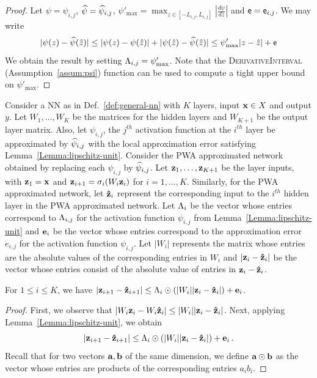 \begin{proof}
        Let $\psi=\psi_{i,j}$, $\widehat{\psi} = \widehat{\psi}_{i,j}$, $\psi'_{\max} = \max_{z \in [-L_{i,j}, L_{i,j}]} \left|\frac{d\psi}{dz}\right|$ and $\mathsf{e}= \mathsf{e}_{i,j}$. We may write
	\begin{equation*}
	    | \psi(z) - \widehat{\psi}(\hat{z}) | \leq  |  \psi(z)  - \psi(\hat{z}) |  + |  \psi(\hat{z}) -  \widehat{\psi}(\hat{z}) | \leq  \psi'_{\max} | z - \hat{z} | + \mathsf{e}
	\end{equation*}
	We obtain the result by setting   $\Lambda_{i,j} =\psi'_{\max}$. Note that the \textsc{DerivativeInterval} (Assumption~\ref{assum:psi}) function can be used to compute a tight upper bound on $\psi'_{\max}$.
\end{proof}
Consider a NN as in Def.~\ref{def:general-nn} with $K$ layers, input $\mathbf{x} \in X $ and output $y$.  Let $W_1, \ldots, W_{K}$ be the matrices for the hidden layers and $W_{K+1}$ be the output layer matrix. Also, let $\psi_{i,j}$, the $j^{th}$ activation function at the $i^{th}$ layer be approximated by $\widehat{\psi}_{i,j}$ with the local approximation error satisfying Lemma~\ref{Lemma:lipschitz-unit}. 
Consider the PWA approximated network obtained by replacing each $\psi_{i,j}$ by $\widehat{\psi}_{i,j}$.
Let $ \mathbf{z}_1, \ldots, \mathbf{z}_{K+1}$ be the layer inputs, with $\mathbf{z}_1 = \mathbf{x}$ and $\mathbf{z}_{i+1} = \sigma_i( W_i \mathbf{z}_i)$ for $i = 1, \ldots, K$. Similarly, for the PWA approximated network, let $\mathbf{\hat{z}}_i$ represent the corresponding input to the $i^{th}$ hidden layer in the PWA approximated network. Let $\Lambda_i$ be the vector whose entries correspond to $\Lambda_{i,j}$ for the activation function $\psi_{i,j}$ from Lemma~\ref{Lemma:lipschitz-unit} and $\mathbf{e}_{i}$ be the vector whose entries correspond to the approximation error $e_{i,j}$ for the activation function $\psi_{i,j}$.  Let $|W_i|$ represents the matrix whose entries are the absolute values of the corresponding entries in $W_i$ and $|\mathbf{z}_i - \mathbf{\hat{z}}_i| $ be the vector whose entries consist of the  absolute value of entries in $\mathbf{z}_i - \mathbf{\hat{z}}_i$.

\begin{lemma}\label{Lemma:layer-approximation}
For $1 \leq i \leq K$, we have $|\mathbf{z}_{i+1} - \mathbf{\hat{z}}_{i+1} | \leq \Lambda_i \odot (|W_i| | \mathbf{z}_i - \mathbf{\hat{z}}_i|) + \mathbf{e}_i$.
\end{lemma}
\begin{proof}
First, we observe that $|W_i \mathbf{z}_i - W_i \mathbf{\hat{z}}_i | \leq |W_i| | \mathbf{z}_i - \mathbf{\hat{z}}_i| $. Next, applying Lemma~\ref{Lemma:lipschitz-unit}, we obtain 
\[
|\mathbf{z}_{i+1} - \mathbf{\hat{z}}_{i+1} | \leq \Lambda_i \odot (|W_i| | \mathbf{z}_i - \mathbf{\hat{z}}_i|) + \mathbf{e}_i\,.
\]
 Recall that for two vectors $\mathbf{a}, \mathbf{b}$ of the same dimension,  we define $\mathbf{a} \odot \mathbf{b}$ as the vector whose entries are products of the corresponding entries $a_i b_i$.
\end{proof}

